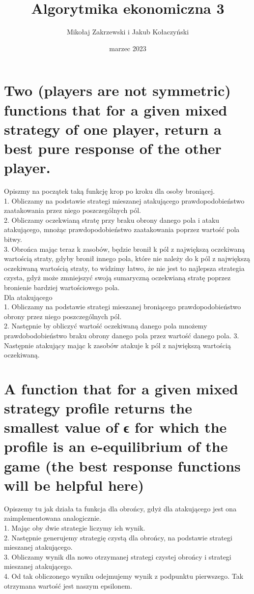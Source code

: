 \documentclass{article}
\title{Algorytmika ekonomiczna 3}
\author{Mikołaj Zakrzewski i Jakub Kołaczyński}
\date{marzec 2023}
\begin{document}
\maketitle
\section*{Two (players are not symmetric) functions that for a given mixed strategy
of one player, return a best pure response of the other player.}
\begin{flushleft}
    Opiszmy na początek taką funkcję krop po kroku dla osoby broniącej.\\
    1. Obliczamy na podstawie strategi mieszanej atakującego prawdopodobieństwo zaatakowania przez niego poszczególnych pól.\\
    2. Obliczamy oczekwianą stratę przy braku obrony danego pola i ataku atakującego, mnożąc prawdopodobieństwo zaatakowania poprzez wartość pola bitwy.\\
    3. Obrońca mając teraz k zasobów, będzie bronił k pól z największą oczekiwaną wartością straty, gdyby bronił innego pola, które nie należy do k pól z największą oczekiwaną wartością straty, to widzimy łatwo, że nie jest to najlepsza strategia czysta, gdyż może zmniejszyć swoją sumaryczną oczekwianą stratę poprzez bronienie bardziej wartościowego pola.
    \\
    Dla atakującego \\
    1. Obliczamy na podstawie strategi mieszanej broniącego prawdopodobieństwo obrony przez niego poszczególnych pól.\\
    2. Następnie by obliczyć wartość oczekiwaną danego pola mnożemy prawdobodobieństwo braku obrony danego pola przez wartość danego pola.
    3. Następnie atakujący mając k zasobów atakuje k pól z największą wartością oczekiwaną.\\
    
\end{flushleft}

\section*{A function that for a given mixed strategy profile returns the smallest
value of ϵ for which the profile is an e-equilibrium of the game (the best
response functions will be helpful here)}

\begin{flushleft}
Opiszemy tu jak działa ta funkcja dla obrońcy, gdyż dla atakującego jest ona zaimplementowana analogicznie.\\
    1. Mając oby dwie strategie liczymy ich wynik.\\
    2. Następnie generujemy strategię czystą dla obrońcy, na podstawie strategi mieszanej atakującego.\\
    3. Obliczamy wynik dla nowo otrzymanej strategi czystej obrońcy i strategi mieszanej atakującego.\\
    4. Od tak obliczonego wyniku odejmujemy wynik z podpunktu pierwszego. Tak otrzymana wartość jest naszym epsilonem.
\end{flushleft}
\end{document}
